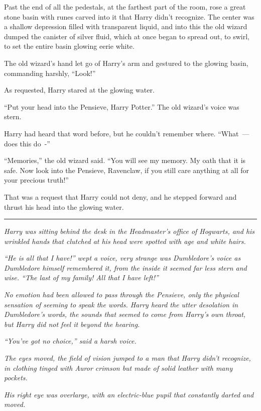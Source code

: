 Past the end of all the pedestals, at the farthest part of the room, rose a great stone basin with runes carved into it that Harry didn't recognize. The center was a shallow depression filled with transparent liquid, and into this the old wizard dumped the canister of silver fluid, which at once began to spread out, to swirl, to set the entire basin glowing eerie white.

The old wizard's hand let go of Harry's arm and gestured to the glowing basin, commanding harshly, ``Look!''

As requested, Harry stared at the glowing water.

``Put your head into the Pensieve, Harry Potter.'' The old wizard's voice was stern.

Harry had heard that word before, but he couldn't remember where. ``What~--- does this do~-''

``Memories,'' the old wizard said. ``You will see my memory. My oath that it is safe. Now look into the Pensieve, Ravenclaw, if you still care anything at all for your precious truth!''

That was a request that Harry could not deny, and he stepped forward and thrust his head into the glowing water.

\begin{center}\rule{3in}{0.4pt}\end{center}

\emph{Harry was sitting behind the desk in the Headmaster's office of Hogwarts, and his wrinkled hands that clutched at his head were spotted with age and white hairs.}

\emph{``He is all that I have!'' wept a voice, very strange was Dumbledore's voice as Dumbledore himself remembered it, from the inside it seemed far less stern and wise. ``The last of my family! All that I have left!''}

\emph{No emotion had been allowed to pass through the Pensieve, only the physical sensation of seeming to speak the words. Harry heard the utter desolation in Dumbledore's words, the sounds that seemed to come from Harry's own throat, but Harry did not feel it beyond the hearing.}

\emph{``You've got no choice,'' said a harsh voice.}

\emph{The eyes moved, the field of vision jumped to a man that Harry didn't recognize, in clothing tinged with Auror crimson but made of solid leather with many pockets.}

\emph{His right eye was overlarge, with an electric-blue pupil that constantly darted and moved.}

